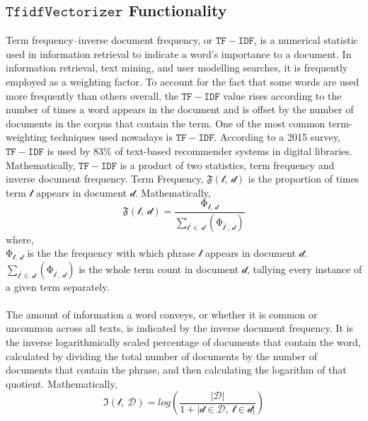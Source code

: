 \documentclass[sn-basic]{sn-jnl}%
\theoremstyle{thmstyleone}%
\theoremstyle{thmstyletwo}%
\theoremstyle{thmstylethree}%
\begin{document}
\subsection{$\mathtt{TfidfVectorizer}$ Functionality}
Term frequency–inverse document frequency, or $\mathtt{TF-IDF}$, is a numerical statistic used in information retrieval to indicate a word's importance to a document. In information retrieval, text mining, and user modelling searches, it is frequently employed as a weighting factor. To account for the fact that some words are used more frequently than others overall, the $\mathtt{TF-IDF}$ value rises according to the number of times a word appears in the document and is offset by the number of documents in the corpus that contain the term. One of the most common term-weighting techniques used nowadays is $\mathtt{TF-IDF}$. According to a 2015 survey, $\mathtt{TF-IDF}$ is used by 83\% of text-based recommender systems in digital libraries. Mathematically, $\mathtt{TF-IDF}$ is a product of two statistics, term frequency and inverse document frequency. Term Frequency, $\mathfrak{F}(\mathcal{t},\ \mathcal{d})$ is the proportion of times term $\mathcal{t}$ appears in document $\mathcal{d}$. Mathematically, 
\begin{equation}
\mathfrak{F}(\mathcal{t},\ \mathcal{d})=\frac{\mathrm{\Phi}_{\mathcal{t},\ \mathcal{d}}}{\sum_{\mathcal{t}^\prime\in\ \mathcal{d}}\left(\mathrm{\Phi}_{\mathcal{t}^\prime,\ \mathcal{d}}\right)}
\end{equation}
where, \\
$\mathrm{\Phi}_{\mathcal{t},\ \mathcal{d}}$ is the the frequency with which phrase $\mathcal{t}$ appears in document $\mathcal{d}$.\\
$\sum_{\mathcal{t}^\prime\in\ \mathcal{d}}\left(\mathrm{\Phi}_{\mathcal{t}^\prime,\ \mathcal{d}}\right)$ is the whole term count in document $\mathcal{d}$, tallying every instance of a given term separately.\\\\
The amount of information a word conveys, or whether it is common or uncommon across all texts, is indicated by the inverse document frequency. It is the inverse logarithmically scaled percentage of documents that contain the word, calculated by dividing the total number of documents by the number of documents that contain the phrase, and then calculating the logarithm of that quotient. Mathematically,
\begin{equation}
\mathfrak{I}(\mathcal{t},\ \mathcal{D})=log{\left(\frac{\left\lvert\mathcal{D}\right\rvert}{1+\left\lvert\mathcal{d}\in\mathcal{D},\ \mathcal{t}\in\mathcal{d}\right\rvert}\right)}
\end{equation}
\end{document}

